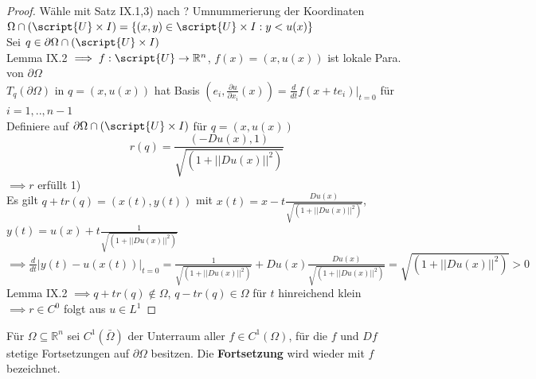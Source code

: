 \begin{proof}
  Wähle mit Satz IX.1,3) nach ? Umnummerierung der Koordinaten $\Omega \cap (\script{U}\times I) = \{ (x,y)\in \script{U}\times I: y < u(x) \}$ \\
  Sei $q\in \partial\Omega \cap (\script{U}\times I)$ \\
  Lemma IX.2 $\implies f:\script{U} \to \mathbb{R}^n$, $f(x) = (x, u(x))$ ist lokale Para. von $\partial\Omega$ \\
  $T_q(\partial\Omega)$ in $q = (x, u(x))$ hat Basis $(e_i, \frac{\partial u}{\partial x_i}(x)) = \frac{d}{dt} f(x+te_i)|_{t=0}$ für $i=1, ..,n-1$\\
  Definiere auf $\partial\Omega \cap (\script{U}\times I)$ für $q=(x,u(x))$ $$r(q) = \frac{(-Du(x), 1)}{\sqrt{(1+||Du(x)||^2)}}$$
  $\implies r$ erfüllt 1) \\
  Es gilt $q+t r(q) = (x(t),y(t))$ mit $x(t) = x-t\frac{Du(x)}{\sqrt{(1+||Du(x)||^2)}}$, $y(t) = u(x) + t \frac{1}{\sqrt{(1+||Du(x)||^2)}}$ \\
  $\implies \frac{d}{dt} |y(t)-u(x(t))|_{t=0} = \frac{1}{\sqrt{(1+||Du(x)||^2)}} + Du(x) \frac{Du(x)}{\sqrt{(1+||Du(x)||^2)}} = \sqrt{(1+||Du(x)||^2)} > 0$ \\
  Lemma IX.2 $\implies q+t r(q) \notin\Omega$, $q-tr(q)\in\Omega$ für $t$ hinreichend klein \\
  $\implies r\in C^0$ folgt aus $u\in L^1$
\end{proof}
\begin{definition}
  Für $\Omega \subseteq \mathbb{R}^n$ sei $C^1(\bar{\Omega})$ der Unterraum aller $f\in C^1(\Omega)$, für die $f$ und $Df$ stetige Fortsetzungen auf $\partial \Omega$ besitzen. Die \textbf{Fortsetzung} wird wieder mit $f$ bezeichnet.
\end{definition}


